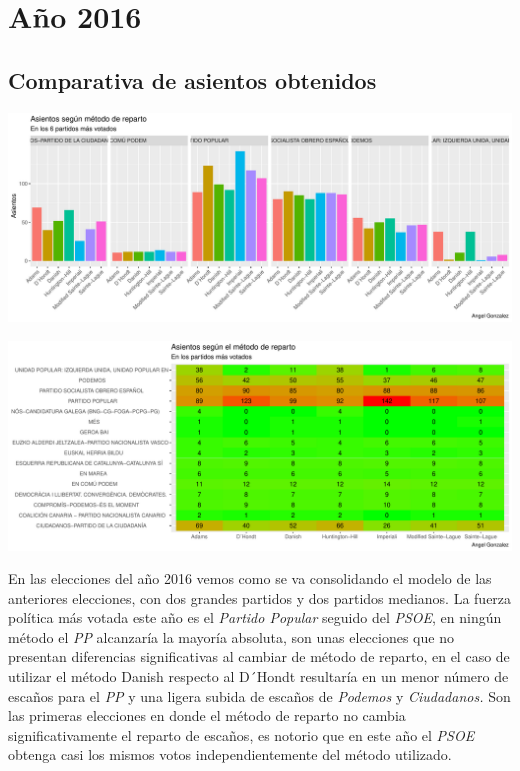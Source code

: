 \documentclass[12pt,a4paper,]{book}
\numberwithin{dummy}{section}
\theoremstyle{ocrenumbox}
\theoremstyle{blacknumex}
\theoremstyle{blacknumbox}
\theoremstyle{ocrenum}
\theoremstyle{ocrenum}
\begin{document}
\hypertarget{auxf1o-2016}{%
\section{Año 2016}\label{auxf1o-2016}}

\hypertarget{comparativa-de-asientos-obtenidos-12}{%
\subsection{Comparativa de asientos
obtenidos}\label{comparativa-de-asientos-obtenidos-12}}

\begin{center}\includegraphics[width=1\linewidth]{figurasR/unnamed-chunk-109-1} \end{center}

\begin{center}\includegraphics[width=1\linewidth]{figurasR/unnamed-chunk-109-2} \end{center}

En las elecciones del año 2016 vemos como se va consolidando el modelo
de las anteriores elecciones, con dos grandes partidos y dos partidos
medianos. La fuerza política más votada este año es el \emph{Partido
Popular} seguido del \emph{PSOE}, en ningún método el \emph{PP}
alcanzaría la mayoría absoluta, son unas elecciones que no presentan
diferencias significativas al cambiar de método de reparto, en el caso
de utilizar el método Danish respecto al D´Hondt resultaría en un menor
número de escaños para el \emph{PP} y una ligera subida de escaños de
\emph{Podemos} y \emph{Ciudadanos.} Son las primeras elecciones en donde
el método de reparto no cambia significativamente el reparto de escaños,
es notorio que en este año el \emph{PSOE} obtenga casi los mismos votos
independientemente del método utilizado.
\end{document}
